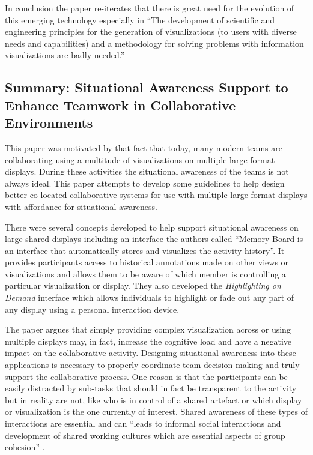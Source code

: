 \documentclass{sig-alternate}
\begin{document}
In conclusion the paper re-iterates that there is great need for the evolution
of this emerging technology especially in ``The development of scientific and
engineering principles for the generation of visualizations  (to users with
diverse needs and capabilities) and a methodology for solving problems with
information visualizations are badly needed.''

\subsection{Summary: Situational Awareness Support to Enhance Teamwork in
Collaborative Environments \cite{Kulyk:2008:SituationalAwareness}} This paper
was motivated by that fact that today, many modern teams are collaborating using
a multitude of visualizations on multiple large format displays. During these
activities the situational awareness of the teams is not always ideal. This
paper attempts to develop some guidelines to help design better co-located
collaborative systems for use with multiple large format displays with
affordance for situational awareness.

There were several concepts developed to help support situational awareness on
large shared displays including an interface the authors called ``Memory Board
is an interface that automatically stores and visualizes the activity history''.
It provides participants access to historical annotations made on other views or
visualizations and allows them to be aware of which member is controlling a
particular visualization or display. They also developed the \emph{Highlighting
on Demand} interface which allows individuals to highlight or fade out any part
of any display using a personal interaction device.

The paper argues that simply providing complex visualization across or using
multiple displays may, in fact, increase the cognitive load and have a negative
impact on the collaborative activity. Designing situational awareness into these
applications is necessary to properly coordinate team decision making and truly
support the collaborative process. One reason is that the participants can be
easily distracted by sub-tasks that should in fact be transparent to the
activity but in reality are not, like who is in control of a shared artefact or
which display or visualization is the one currently of interest. Shared
awareness of these types of interactions are essential and can ``leads to
informal social interactions and development of shared working cultures which
are essential aspects of group cohesion''
\cite{Kulyk:2008:SituationalAwareness}.
\end{document}
